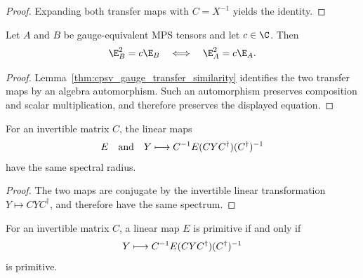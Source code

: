 \begin{proof}\leanok
    Expanding both transfer maps with $C=X^{-1}$ yields the identity.
\end{proof}

\begin{lemma}
    \label{thm:cpsv_gauge_transfer_quasi_idempotence}
    \leanok
    Let $A$ and $B$ be gauge-equivalent MPS tensors and let $c\in\C$. Then
    \begin{align}
        \E_B^2=c\E_B
        \quad\Longleftrightarrow\quad
        \E_A^2=c\E_A.
        \notag
    \end{align}
\end{lemma}

\begin{proof}\leanok
    Lemma~\ref{thm:cpsv_gauge_transfer_similarity} identifies the two transfer
    maps by an algebra automorphism. Such an automorphism preserves composition
    and scalar multiplication, and therefore preserves the displayed equation.
\end{proof}

\begin{lemma}
    \label{thm:cpsv_spectral_radius_similarity}
    \leanok
    For an invertible matrix $C$, the linear maps
    \begin{align}
        E
        \quad\hbox{and}\quad
        Y\longmapsto C^{-1}E(CYC^\dagger)(C^\dagger)^{-1}
        \notag
    \end{align}
    have the same spectral radius.
\end{lemma}

\begin{proof}\leanok
    The two maps are conjugate by the invertible linear transformation
    $Y\mapsto CYC^\dagger$, and therefore have the same spectrum.
\end{proof}

\begin{lemma}
    \label{thm:cpsv_primitivity_similarity}
    \leanok
    For an invertible matrix $C$, a linear map $E$ is primitive if and
    only if
    \begin{align}
        Y\longmapsto C^{-1}E(CYC^\dagger)(C^\dagger)^{-1}
        \notag
    \end{align}
    is primitive.
\end{lemma}

